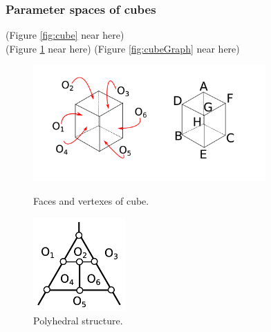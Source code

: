 \documentclass[suppldata, dvipdfmx]{interact}
\theoremstyle{plain}%
\theoremstyle{definition}
\theoremstyle{remark}
\theoremstyle{problemstyle}
\begin{document}
\subsubsection{Parameter spaces of cubes}

\noindent(Figure \ref{fig:cube} near here)\\
(Figure \ref{fig:cubePolyhedralStructure} near here)
\noindent(Figure \ref{fig:cubeGraph}
 near here)

\begin{figure}[h!tbp]
  \begin{minipage}[t]{0.66\textwidth}
 \centering
 \includegraphics[width=3.5in,
 keepaspectratio]{./img/HexahedraWithSphericalFaces/cubes.jpg}
 \caption{Faces and vertexes of cube.}
 \label{fig:cube}
  \end{minipage}
 \hspace*{\fill}
  \begin{minipage}[t]{0.33\textwidth}
   \centering
   \includegraphics[width=1.4in, keepaspectratio]{./img/HexahedraWithSphericalFaces/cube/cubeFaces.jpg}
   \caption{Polyhedral structure.}
   \label{fig:cubePolyhedralStructure}
  \end{minipage}
\end{figure}
\end{document}
